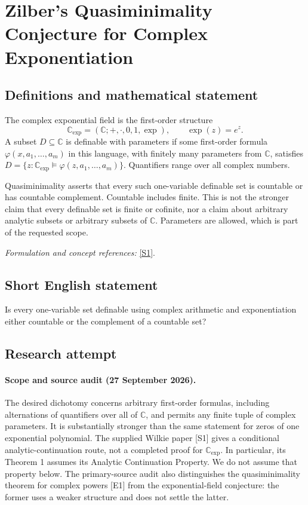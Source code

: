 \documentclass[11pt]{article}
\begin{document}
\section*{\texorpdfstring{Zilber’s Quasiminimality Conjecture for Complex Exponentiation}{Zilber’s Quasiminimality Conjecture for Complex Exponentiation}}\label{30005287}
\subsection{Definitions and mathematical statement}
The complex exponential field is the first-order structure
\[
 {\mathbb{C}}_{\exp}=({\mathbb{C}};+ ,\cdot,0,1,\exp),\qquad \exp(z)=e^z.
\]
A subset $D\subseteq{\mathbb{C}}$ is definable with parameters if some first-order formula $\varphi(x,a_1,\ldots,a_m)$ in this language, with finitely many parameters from ${\mathbb{C}}$, satisfies $D=\{z:{\mathbb{C}}_{\exp}\models\varphi(z,a_1,\ldots,a_m)\}$. Quantifiers range over all complex numbers.

Quasiminimality asserts that every such one-variable definable set is countable or has countable complement. Countable includes finite. This is not the stronger claim that every definable set is finite or cofinite, nor a claim about arbitrary analytic subsets or arbitrary subsets of ${\mathbb{C}}$. Parameters are allowed, which is part of the requested scope.
\par\smallskip\textit{Formulation and concept references:} \href{https://arxiv.org/pdf/2306.14562v1}{[S1]}.

\subsection{Short English statement}
Is every one-variable set definable using complex arithmetic and exponentiation either countable or the complement of a countable set?
\subsection{Research attempt}

\paragraph{Scope and source audit (27 September 2026).}
The desired dichotomy concerns arbitrary first-order formulas, including
alternations of quantifiers over all of $\mathbb C$, and permits any finite
tuple of complex parameters. It is substantially stronger than the same
statement for zeros of one exponential polynomial. The supplied Wilkie
paper [S1] gives a conditional analytic-continuation route, not a completed
proof for $\mathbb C_{\exp}$. In particular, its Theorem 1 assumes its
Analytic Continuation Property. We do not assume that property below.
The primary-source audit also distinguishes the quasiminimality theorem
for complex powers [E1] from the exponential-field conjecture: the former
uses a weaker structure and does not settle the latter.
\end{document}
